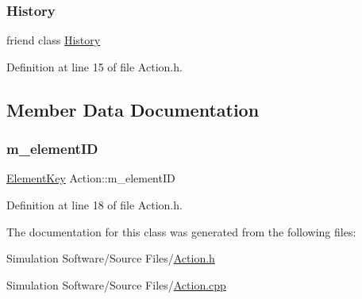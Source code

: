 \subsubsection{\texorpdfstring{History}{History}}
{\footnotesize\ttfamily friend class \hyperlink{class_history}{History}\hspace{0.3cm}{\ttfamily [friend]}}



Definition at line 15 of file Action.\+h.



\subsection{Member Data Documentation}
\mbox{\label{class_action_aa7b19bcb67e58c39675df7204d593b89}} 
\subsubsection{\texorpdfstring{m\+\_\+element\+ID}{m\_elementID}}
{\footnotesize\ttfamily \hyperlink{_graphical_element_8h_ade5fd6c85839a416577ff9de1605141e}{Element\+Key} Action\+::m\+\_\+element\+ID\hspace{0.3cm}{\ttfamily [protected]}}



Definition at line 18 of file Action.\+h.



The documentation for this class was generated from the following files\+:\begin{DoxyCompactItemize}
\item 
Simulation Software/\+Source Files/\hyperlink{_action_8h}{Action.\+h}\item 
Simulation Software/\+Source Files/\hyperlink{_action_8cpp}{Action.\+cpp}\end{DoxyCompactItemize}
